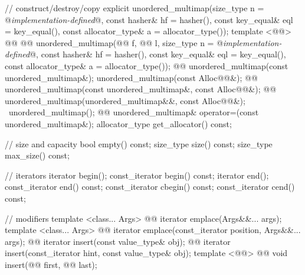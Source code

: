 \documentclass[american,twoside]{book}
\begin{document}
\begin{codeblock}
{{    // construct/destroy/copy
    explicit unordered_multimap(size_type n = @\textit{implementation-defined}@,
                                const hasher& hf = hasher(),
                                const key_equal& eql = key_equal(),
                                const allocator_type& a = allocator_type());
    template <@@>
      @@
            @@
      unordered_multimap(@@ f, @@ l,
                         size_type n = @\textit{implementation-defined}@,
                         const hasher& hf = hasher(),
                         const key_equal& eql = key_equal(),
                         const allocator_type& a = allocator_type());
    @@ 
      unordered_multimap(const unordered_multimap&);
    unordered_multimap(const Alloc@@&);
    @@
       unordered_multimap(const unordered_multimap&, const Alloc@@&);
    @@
      unordered_multimap(unordered_multimap&&, const Alloc@@&);
    ~unordered_multimap();
    @@
      unordered_multimap& operator=(const unordered_multimap&);
    allocator_type get_allocator() const;

    // size and capacity
    bool empty() const;
    size_type size() const;
    size_type max_size() const;

    // iterators
    iterator       begin();
    const_iterator begin() const;
    iterator       end();
    const_iterator end() const;
    const_iterator cbegin() const;
    const_iterator cend() const;

    // modifiers
    template <class... Args> 
      @@
      iterator emplace(Args&&... args);
    template <class... Args> 
      @@
      iterator emplace(const_iterator position, Args&&... args);
    @@ 
      iterator insert(const value_type& obj);
    @@ 
      iterator insert(const_iterator hint, const value_type& obj);
    template <@@> 
      @@
      void insert(@@ first, @@ last);

}}
\end{codeblock}
\end{document}
